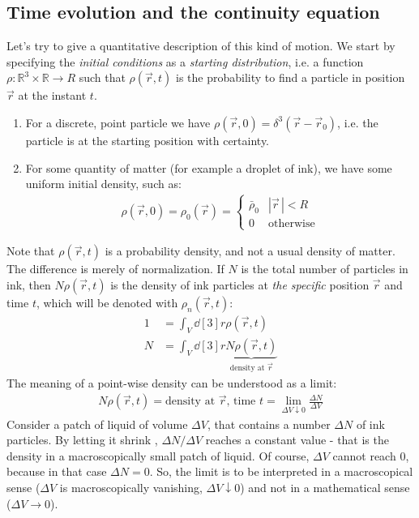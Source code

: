\documentclass[../template.tex]{subfiles}
\begin{document}
\subsection{Time evolution and the continuity equation}
Let's try to give a quantitative description of this kind of motion. We start by specifying the \textit{initial conditions} as a \textit{starting distribution}, i.e. a function $\rho\colon \mathbb{R}^3 \times \mathbb{R} \to R$ such that $\rho(\vec{r},t)$ is the probability to find a particle in position $\vec{r}$ at the instant $t$. 
\begin{enumerate}
\item For a discrete, point particle we have $\rho(\vec{r},0)=\delta^3(\vec{r}-\vec{r}_0)$, i.e. the particle is at the starting position with certainty.
\item For some quantity of matter (for example a droplet of ink), we have some uniform initial density, such as:
\begin{align*}
\rho(\vec{r},0) = \rho_0(\vec{r}) = \begin{cases}
\bar{\rho}_0 & |\vec{r}\,|<R\\
0 & \text{otherwise}
\end{cases}
\end{align*}
\end{enumerate}
Note that $\rho(\vec{r},t)$ is a probability density, and not a usual density of matter. The difference is merely of normalization. If $N$ is the total number of particles in ink, then $N\rho(\vec{r},t)$ is the density of ink particles at \textit{the specific} position $\vec{r}$ and time $t$, which will be denoted with $\rho_n(\vec{r},t)$:
\begin{align*}
1 &= \int_V \dd[3]{r} \rho(\vec{r},t)\\
N &= \int_V \dd[3]{r} \underbrace{N\rho(\vec{r},t)}_{\text{density at $\vec{r}$}}
\end{align*}
The meaning of a point-wise density can be understood as a limit:
\begin{align*}
N \rho(\vec{r},t) = \text{density at $\vec{r}$, time $t$} = \lim_{\Delta V \downarrow 0} \frac{\Delta N}{\Delta V}
\end{align*}
Consider a patch of liquid of volume $\Delta V$, that contains a number $\Delta N$ of ink particles. By letting it shrink , $\Delta N/\Delta V$ reaches a constant value - that is the density in a macroscopically small patch of liquid. Of course, $\Delta V$ cannot reach $0$, because in that case $\Delta N = 0$. So, the limit is to be interpreted in a macroscopical sense ($\Delta V$ is macroscopically vanishing, $\Delta V \downarrow 0$) and not in a mathematical sense ($\Delta V \to 0$).
\end{document}
